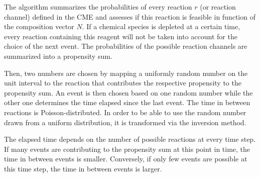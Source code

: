         The algorithm summarizes the probabilities of every reaction $r$ (or reaction channel) defined in the CME and assesses if this reaction is feasible in function of the composition vector $N$. If a chemical species is depleted at a certain time, every reaction containing this reagent will not be taken into account for the choice of the next event. The probabilities of the possible reaction channels are summarized into a propensity sum.

        Then, two numbers are chosen by mapping a uniformly random number on the unit interval to the reaction that contributes the respective propensity to the propensity sum. An event is then chosen based on one random number while the other one determines the time elapsed since the last event. The time in between reactions is Poisson-distributed. In order to be able to use the random number drawn from a uniform distribution, it is transformed via the inversion method.

        The elapsed time depends on the number of possible reactions at every time step. If many events are contributing to the propensity sum at this point in time, the time in between events is smaller. Conversely, if only few events are possible at this time step, the time in between events is larger.\\



